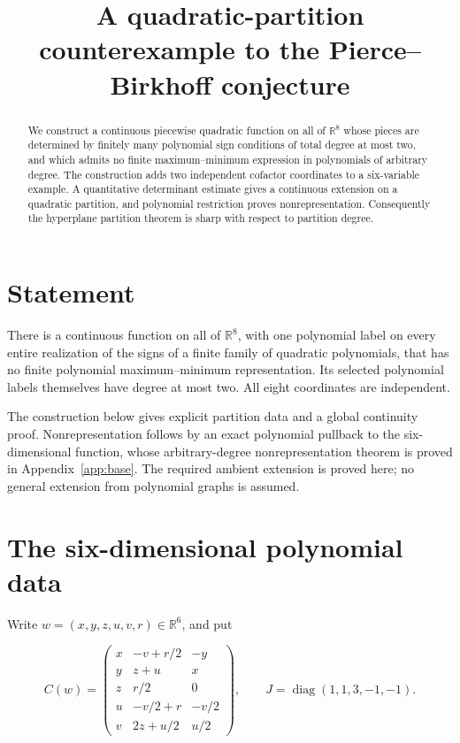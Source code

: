 \documentclass[11pt]{article}
\title{A quadratic-partition counterexample to the Pierce--Birkhoff conjecture}
\author{}
\date{}
\begin{document}
\maketitle
\begin{abstract}
We construct a continuous piecewise quadratic function on all of
$\mathbb R^8$ whose pieces are determined by finitely many polynomial
sign conditions of total degree at most two, and which admits no finite
maximum--minimum expression in polynomials of arbitrary degree.
The construction adds two independent cofactor coordinates to a
six-variable example. A quantitative determinant estimate gives a
continuous extension on a quadratic partition, and polynomial
restriction proves nonrepresentation. Consequently the hyperplane
partition theorem is sharp with respect to partition degree.
\end{abstract}
\section{Statement}

There is a continuous function on all of \(\mathbb R^8\), with one
polynomial label on every entire realization of the signs of a finite
family of quadratic polynomials, that has no finite polynomial
maximum--minimum representation. Its selected polynomial labels themselves
have degree at most two. All eight coordinates are independent.

The construction below gives explicit partition data and a global
continuity proof. Nonrepresentation follows by an exact polynomial
pullback to the six-dimensional function, whose arbitrary-degree
nonrepresentation theorem is proved in Appendix~\ref{app:base}. The required
ambient extension is proved here; no general extension from polynomial
graphs is assumed.

\section{The six-dimensional polynomial data}

Write \(w=(x,y,z,u,v,r)\in\mathbb R^6\), and put

\[
C(w)=
\begin{pmatrix}
x&-v+r/2&-y\\
y&z+u&x\\
z&r/2&0\\
u&-v/2+r&-v/2\\
v&2z+u/2&u/2
\end{pmatrix},
\qquad
J=\operatorname{diag}(1,1,3,-1,-1).
\tag{Q1}
\]
\end{document}
